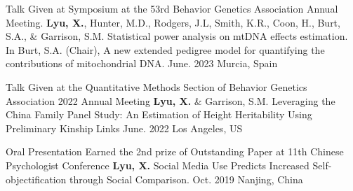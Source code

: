 \begin{cventries2}
    \cventryx
	{Talk Given at Symposium at the 53rd Behavior Genetics Association Annual Meeting. } %
    {\textbf{Lyu, X.}, Hunter, M.D., Rodgers, J.L, Smith, K.R., Coon, H., Burt, S.A., \& Garrison, S.M.  Statistical power analysis on mtDNA effects estimation. In Burt, S.A. (Chair), A new extended pedigree model for quantifying the contributions of mitochondrial DNA.} 
    {June. 2023} %
    {Murcia, Spain}
    
    \cventryx
	{Talk Given at the Quantitative Methods Section of Behavior Genetics Association 2022 Annual Meeting} %
    {\textbf{Lyu, X.} \& Garrison, S.M. Leveraging the China Family Panel Study: An Estimation of Height Heritability Using Preliminary Kinship Links } 
    {June. 2022} %
    {Los Angeles, US}
    
    \cventryx
 	{Oral Presentation Earned the 2nd prize of Outstanding Paper at 11th Chinese Psychologist Conference} %
    {\textbf{Lyu, X.} Social Media Use Predicts Increased Self-objectification through Social Comparison.}
    {Oct. 2019}
    {Nanjing, China}
\end{cventries2}